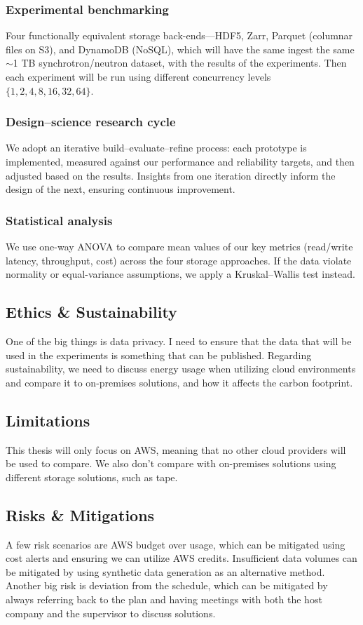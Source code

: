 \documentclass{article}
\begin{document}
\subsubsection{Experimental benchmarking}
Four functionally equivalent storage back-ends—HDF5, Zarr, Parquet (columnar files on S3), and DynamoDB (NoSQL), which will have the same ingest the same $\sim$1 TB synchrotron/neutron dataset, with the results of the experiments. Then each experiment will be run using different concurrency levels $\{1,2,4,8,16,32,64\}$.

\subsubsection{Design–science research cycle}
We adopt an iterative build–evaluate–refine process: each prototype is implemented, measured against our performance and reliability targets, and then adjusted based on the results. Insights from one iteration directly inform the design of the next, ensuring continuous improvement.

\subsubsection{Statistical analysis}
We use one-way ANOVA to compare mean values of our key metrics (read/write latency, throughput, cost) across the four storage approaches. If the data violate normality or equal-variance assumptions, we apply a Kruskal–Wallis test instead.



\subsection{Ethics \& Sustainability}
One of the big things is data privacy. I need to ensure that the data that will be used in the experiments is something that can be published. Regarding sustainability, we need to discuss energy usage when utilizing cloud environments and compare it to on-premises solutions, and how it affects the carbon footprint.

\subsection{Limitations}
This thesis will only focus on AWS, meaning that no other cloud providers will be used to compare. We also don't compare with on-premises solutions using different storage solutions, such as tape.

\subsection{Risks \& Mitigations}
A few risk scenarios are AWS budget over usage, which can be mitigated using cost alerts and ensuring we can utilize AWS credits. Insufficient data volumes can be mitigated by using synthetic data generation as an alternative method. Another big risk is deviation from the schedule, which can be mitigated by always referring back to the plan and having meetings with both the host company and the supervisor to discuss solutions. 
\end{document}
